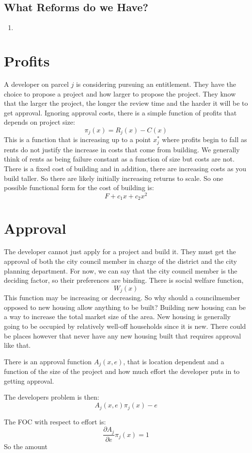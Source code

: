 \documentclass[12pt]{article}
\theoremstyle{definition}
\begin{document}
\subsection{What Reforms do we Have?}
\begin{enumerate}
   \item 
\end{enumerate}


\section{Profits}
A developer on parcel $j$ is considering pursuing an entitlement. They have the choice to propose a project and how larger to propose the project. They know that the larger the project, the longer the review time and the harder it will be to get approval. Ignoring approval costs, there is a simple function of profits that depends on project size:
$$\pi_j(x)= R_j(x)-C(x)$$
This is a function that is increasing up to a point $x^*_j$ where profits begin to fall as rents do not justify the increase in costs that come from building. We generally think of rents as being failure constant as a function of size but costs are not. There is a fixed cost of building and in addition, there are increasing costs as you build taller. So there are likely initially increasing returns to scale. So one possible functional form for the cost of building is:
$$F+c_1x + c_2x^2$$

\section{Approval}
The developer cannot just apply for a project and build it. They must get the approval of both the city council member in charge of the district and the city planning department. For now, we can say that the city council member is the deciding factor, so their preferences are binding. There is social welfare function,
$$W_j(x)$$ 
This function may be increasing or decreasing. So why should a councilmember opposed to new housing allow anything to be built? Building new housing can be a way to increase the total market size of the area. New housing is generally going to be occupied by relatively well-off households since it is new. There could be places however that never have any new housing built that requires approval like that. 

There is an approval function $A_j(x,e)$, that is location dependent and a function of the size of the project and how much effort the developer puts in to getting approval. 

The developers problem is then:
$$A_j(x,e)\pi_j(x)-e$$

The FOC with respect to effort is:
$$\frac{\partial A_j}{\partial e} \pi_j(x) = 1$$
So the amount 
\end{document}
